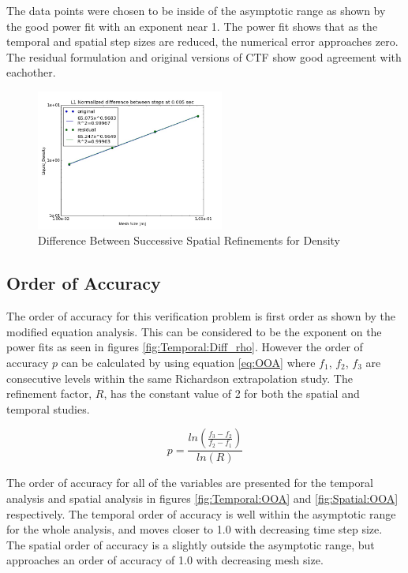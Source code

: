 \documentclass{mc2015}
\begin{document}
The data points were chosen to be inside of the asymptotic range as shown by
the good power fit with an exponent near 1. The power fit shows that as the
temporal and spatial step sizes are reduced, the numerical error approaches
zero. The residual formulation and original versions of CTF show good agreement
with eachother.

\begin{figure}[!h]
	\centering
	\includegraphics[width=0.55\textwidth]{images/Spatial_Study/Difference_rho}
	\caption{Difference Between Successive Spatial Refinements for Density}
	\label{fig:Spatial:Diff_rho}
\end{figure} 

\subsection{Order of Accuracy}

The order of accuracy for this verification problem is first order as shown by
the modified equation analysis. This can be considered to be the exponent on
the power fits as seen in figures \ref{fig:Temporal:Diff_rho}. However the order
of accuracy $p$ can be calculated by using equation \ref{eq:OOA} where $f_{1}$,
$f_{2}$, $f_{3}$ are consecutive levels within the same Richardson extrapolation
study. The refinement factor, $R$, has the constant value of 2 for both the
spatial and temporal studies.

\begin{equation}
	\label{eq:OOA}
	p= \frac{
	      	ln \left(
	      	\frac{f_{3}-f_{2}}{f_{2}-f_{1}}
	      	\right)
	    }{ln(R)}
\end{equation}

The order of accuracy for all of the variables are presented for the temporal
analysis and spatial analysis in figures \ref{fig:Temporal:OOA} and
\ref{fig:Spatial:OOA} respectively. The temporal order of accuracy is well
within the asymptotic range for the whole analysis, and moves closer to 1.0 with
decreasing time step size. The spatial order of accuracy is a slightly outside
the asymptotic range, but approaches an order of accuracy of 1.0 with
decreasing mesh size. 
\end{document}
